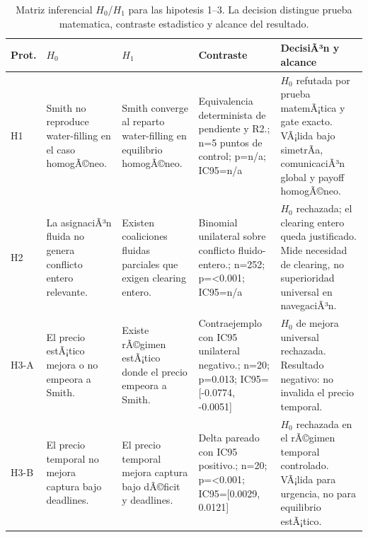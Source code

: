 \begin{table}[H]
\centering
\caption{Matriz inferencial $H_0$/$H_1$ para las hipotesis 1--3. La decision distingue prueba matematica, contraste estadistico y alcance del resultado.}
\label{tab:hypothesis-decision-base-a}
\scriptsize
\begin{tabularx}{\textwidth}{@{}>{\raggedright\arraybackslash}p{}>{\raggedright\arraybackslash}p{}>{\raggedright\arraybackslash}p{}>{\raggedright\arraybackslash}p{}>{\raggedright\arraybackslash}X@{}}
\toprule
Prot. & $H_0$ & $H_1$ & Contraste & DecisiÃ³n y alcance \\
\midrule
H1 & Smith no reproduce water-filling en el caso homogÃ©neo. & Smith converge al reparto water-filling en equilibrio homogÃ©neo. & Equivalencia determinista de pendiente y R2.; n=5 puntos de control; p=n/a; IC95=n/a & $H_0$ refutada por prueba matemÃ¡tica y gate exacto. VÃ¡lida bajo simetrÃ­a, comunicaciÃ³n global y payoff homogÃ©neo. \\
H2 & La asignaciÃ³n fluida no genera conflicto entero relevante. & Existen coaliciones fluidas parciales que exigen clearing entero. & Binomial unilateral sobre conflicto fluido-entero.; n=252; p=\textless{}0.001; IC95=n/a & $H_0$ rechazada; el clearing entero queda justificado. Mide necesidad de clearing, no superioridad universal en navegaciÃ³n. \\
H3-A & El precio estÃ¡tico mejora o no empeora a Smith. & Existe rÃ©gimen estÃ¡tico donde el precio empeora a Smith. & Contraejemplo con IC95 unilateral negativo.; n=20; p=0.013; IC95=[-0.0774, -0.0051] & $H_0$ de mejora universal rechazada. Resultado negativo: no invalida el precio temporal. \\
H3-B & El precio temporal no mejora captura bajo deadlines. & El precio temporal mejora captura bajo dÃ©ficit y deadlines. & Delta pareado con IC95 positivo.; n=20; p=\textless{}0.001; IC95=[0.0029, 0.0121] & $H_0$ rechazada en el rÃ©gimen temporal controlado. VÃ¡lida para urgencia, no para equilibrio estÃ¡tico. \\
\bottomrule
\end{tabularx}
\end{table}

